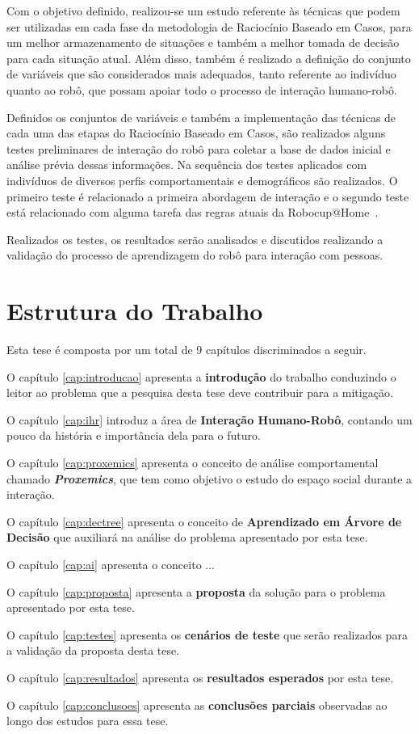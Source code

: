 Com o objetivo definido, realizou-se um estudo referente às técnicas que podem ser utilizadas em cada fase da metodologia de Raciocínio Baseado em Casos, para um melhor armazenamento de situações e também a melhor tomada de decisão para cada situação atual. Além disso, também é realizado a definição do conjunto de variáveis que são considerados mais adequados, tanto referente ao indivíduo quanto ao robô, que possam apoiar todo o processo de interação humano-robô.

Definidos os conjuntos de variáveis e também a implementação das técnicas de cada uma das etapas do Raciocínio Baseado em Casos, são realizados alguns testes preliminares de interação do robô para coletar a base de dados inicial e análise prévia dessas informações. Na sequência dos testes aplicados com indivíduos de diversos perfis comportamentais e demográficos são realizados. O primeiro teste é relacionado a primeira abordagem de interação e o segundo teste está relacionado com alguma tarefa das regras atuais da Robocup@Home~\cite{Robocup:2015}.

Realizados os testes, os resultados serão analisados e discutidos realizando a validação do processo de aprendizagem do robô para interação com pessoas.

\section{Estrutura do Trabalho}
Esta tese é composta por um total de 9 capítulos discriminados a seguir.

O capítulo \ref{cap:introducao} apresenta a \textbf{introdução} do trabalho conduzindo o leitor ao problema que a pesquisa desta tese deve contribuir para a mitigação.

O capítulo \ref{cap:ihr} introduz a área de \textbf{Interação Humano-Robô}, contando um pouco da história e importância dela para o futuro.

O capítulo \ref{cap:proxemics} apresenta o conceito de análise comportamental chamado \emph{\textbf{Proxemics}}, que tem como objetivo o estudo do espaço social durante a interação.

O capítulo \ref{cap:dectree} apresenta o conceito de \textbf{Aprendizado em Árvore de Decisão} que auxiliará na análise do problema apresentado por esta tese.

O capítulo \ref{cap:ai} apresenta o conceito ...

O capítulo \ref{cap:proposta} apresenta a \textbf{proposta} da solução para o problema apresentado por esta tese.

O capítulo \ref{cap:testes} apresenta os \textbf{cenários de teste} que serão realizados para a validação da proposta desta tese.

O capítulo \ref{cap:resultados} apresenta os \textbf{resultados esperados} por esta tese.

O capítulo \ref{cap:conclusoes} apresenta as \textbf{conclusões parciais} observadas ao longo dos estudos para essa tese.
